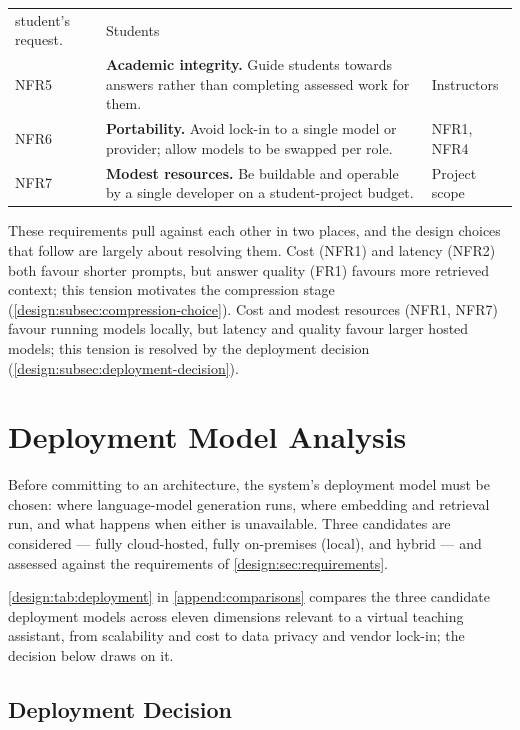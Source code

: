 \begin{table}[htb]
\begin{tabular}{l L{0.62\textwidth} L{0.17\textwidth}}
           student's request. & Students \\
    NFR5 & \textbf{Academic integrity.} Guide students towards answers
           rather than completing assessed work for them. & Instructors \\
    NFR6 & \textbf{Portability.} Avoid lock-in to a single model or provider;
           allow models to be swapped per role. & NFR1, NFR4 \\
    NFR7 & \textbf{Modest resources.} Be buildable and operable by a single
           developer on a student-project budget. & Project scope \\
    \hline
  \end{tabular}
\end{table}

These requirements pull against each other in two places, and the design
choices that follow are largely about resolving them. Cost (NFR1) and
latency (NFR2) both favour shorter prompts, but answer quality (FR1) favours
more retrieved context; this tension motivates the compression stage
(\autoref{design:subsec:compression-choice}). Cost and modest resources
(NFR1, NFR7) favour running models locally, but latency and quality favour
larger hosted models; this tension is resolved by the deployment decision
(\autoref{design:subsec:deployment-decision}).

\section{Deployment Model Analysis}
\label{design:sec:deployment}

Before committing to an architecture, the system's deployment model must be
chosen: where language-model generation runs, where embedding and retrieval
run, and what happens when either is unavailable. Three candidates are
considered --- fully cloud-hosted, fully on-premises (local), and hybrid ---
and assessed against the requirements of \autoref{design:sec:requirements}.

\autoref{design:tab:deployment} in \autoref{append:comparisons} compares the
three candidate deployment models across eleven dimensions relevant to a
virtual teaching assistant, from scalability and cost to data privacy and
vendor lock-in; the decision below draws on it.

\subsection{Deployment Decision}
\label{design:subsec:deployment-decision}

